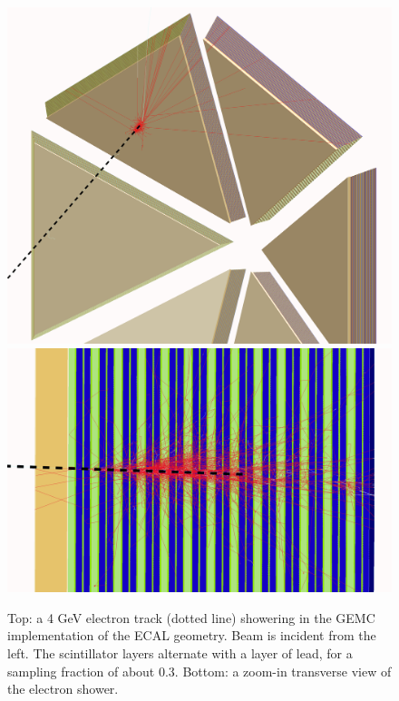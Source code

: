 \begin{figure}
	\centering
	\includegraphics[width=0.99\columnwidth,keepaspectratio]{img/ecGeometry.png}
	\includegraphics[width=0.99\columnwidth,keepaspectratio]{img/ecDetail.png}
	\caption{Top: a 4 GeV electron track (dotted line) showering in the GEMC implementation of the ECAL geometry.
        	 Beam is incident from the left.
             The scintillator layers alternate with a layer of lead, for a sampling fraction of about 0.3.
             Bottom: a zoom-in transverse view of the electron shower.}
	\label{fig:ecGeometry}
\end{figure}



